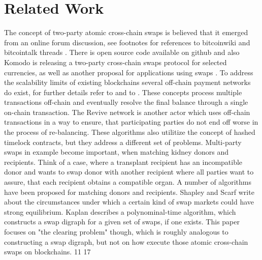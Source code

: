 \chapter{Related Work}
\label{ch:chapter03}

The concept of two-party atomic cross-chain swaps is believed that it emerged from an online forum discussion, see footnotes for references to bitcoinwiki and bitcointalk threads  . There is open source code available on github   and also Komodo \cite{barterdex2020} is releasing a two-party cross-chain swaps protocol for selected currencies, as well as another proposal for applications using swaps \cite{zyskind2018enigma}. To address the scalability limits of existing blockchains several off-chain payment networks do exist, for further details refer to  and to \cite{poon2016bitcoin} \cite{decker2015fast} \cite{green2017bolt}. These concepts process multiple transactions off-chain and eventually resolve the final balance through a single on-chain transaction. The Revive network \cite{khalil2017revive} is another actor which uses off-chain transactions in a way to ensure, that participating parties do not end off worse in the process of re-balancing. These algorithms also utilitize the concept of hashed timelock contracts, but they address a different set of problems. Multi-party swaps in example become important, when matching kidney donors and recipients. Think of a case, where a transplant recipient has an incompatible donor and wants to swap donor with another recipient where all parties want to assure, that each recipient obtains a compatible organ. A number of algorithms \cite{abraham2007clearing} \cite{dickerson2016position} \cite{jia2017efficient} have been proposed for matching donors and recipients. Shapley and Scarf \cite{shapley1974cores} write about the circumstances under which a certain kind of swap markets could have strong equilibrium. Kaplan \cite{kaplan2011improved} describes a polynominal-time algorithm, which constructs a swap digraph for a given set of swaps, if one exists. This paper focuses on "the clearing problem" though, which is roughly analogous to constructing a swap digraph, but not on how execute those atomic cross-chain swaps on blockchains. 
\cite{franklin1998secure} 11 \cite{micali2003simple} 17


